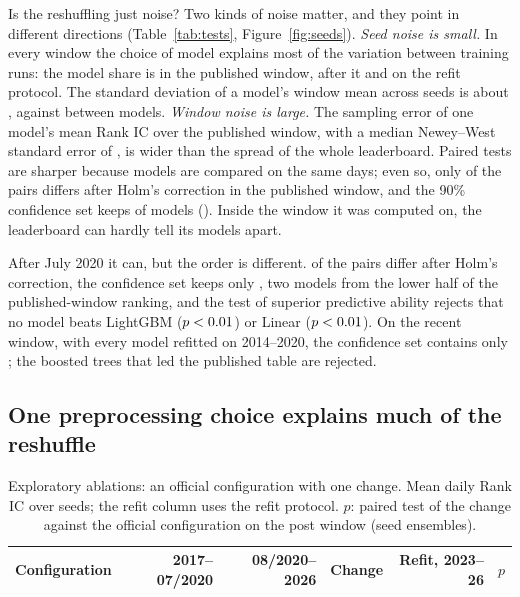 \documentclass[11pt]{article}
\begin{document}
Is the reshuffling just noise?
Two kinds of noise matter, and they point in different directions (Table~\ref{tab:tests}, Figure~\ref{fig:seeds}).
\emph{Seed noise is small.}
In every window the choice of model explains most of the variation between training runs: the model share is \ICCPub{} in the published window, \ICCPost{} after it and \ICCRecent{} on the refit protocol.
The standard deviation of a model's window mean across seeds is about \SeedSDPub{}, against \ModelSDPub{} between models.
\emph{Window noise is large.}
The sampling error of one model's mean Rank IC over the published window, with a median Newey--West standard error of \MedianSEPub{}, is wider than the spread of the whole leaderboard.
Paired tests are sharper because models are compared on the same days; even so, only \PairsHolmPub{} of the \PairsPub{} pairs differs after Holm's correction in the published window, and the 90\% confidence set keeps \MCSSizePub{} of \MCSOfPub{} models (\MCSListPub).
Inside the window it was computed on, the leaderboard can hardly tell its models apart.

After July 2020 it can, but the order is different.
\PairsHolmPost{} of the \PairsPost{} pairs differ after Holm's correction, the confidence set keeps only \MCSListPost{}, two models from the lower half of the published-window ranking, and the test of superior predictive ability rejects that no model beats LightGBM ($p<0.01$) or Linear ($p<0.01$).
On the recent window, with every model refitted on 2014--2020, the confidence set contains only \MCSListRecent{}; the boosted trees that led the published table are rejected.

\subsection{One preprocessing choice explains much of the reshuffle}\label{sec:label}

\begin{table}[t]
\centering\small
\caption{Exploratory ablations: an official configuration with one change. Mean daily Rank IC over seeds; the refit column uses the refit protocol. $p$: paired test of the change against the official configuration on the post window (seed ensembles).}\label{tab:ablation}
\setlength{\tabcolsep}{3.5pt}
\begin{tabular}{lrrrrr}
\toprule
Configuration & 2017--07/2020 & 08/2020--2026 & Change & Refit, 2023--26 & $p$ \\
\midrule

\end{tabular}
\end{table}
\end{document}
